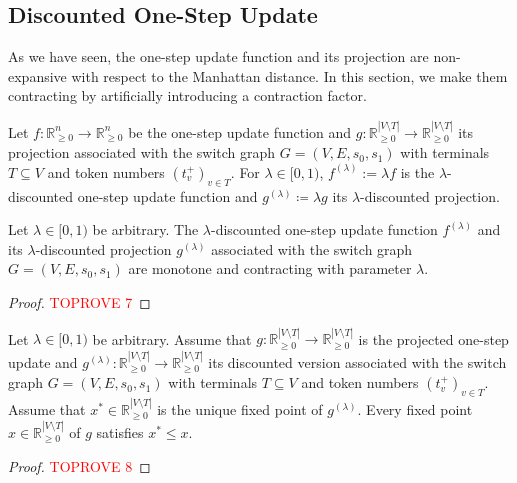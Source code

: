 \documentclass[a4paper,UKenglish,cleveref, autoref, thm-restate]{lipics-v2021}
\newcommand{\R}{\mathbb{R}}
\begin{document}
\subsection{Discounted One-Step Update}
\label{ssec:discounted_one-step_update}

As we have seen, the one-step update function and its projection are non-expansive with respect to the Manhattan distance. In this section, we make them contracting by artificially introducing a contraction factor. 

\begin{definition}
    Let $f : \R^n_{\geq 0} \rightarrow \R^n_{\geq 0}$ be the one-step update function and $g : \R^{|V \setminus T|}_{\geq 0} \rightarrow \R^{|V \setminus T|}_{\geq 0}$ its projection associated with the switch graph $G = (V, E, s_0, s_1)$ with terminals $T \subseteq V$ and token numbers $(t^+_v)_{v \in T}$. For $\lambda \in [0, 1)$, $f^{(\lambda)} := \lambda f$ is the $\lambda$-discounted one-step update function and $g^{(\lambda)} \coloneqq \lambda g$ its $\lambda$-discounted projection.
\end{definition}

\begin{corollary}
    Let $\lambda \in [0, 1)$ be arbitrary. The $\lambda$-discounted one-step update function $f^{(\lambda)}$ and its $\lambda$-discounted projection $g^{(\lambda)}$ associated with the switch graph $G = (V, E, s_0, s_1)$ are monotone and contracting with parameter $\lambda$.
\end{corollary}
\begin{proof}\textcolor{red}{TOPROVE 7}\end{proof}

\begin{lemma}
\label{lemma:unique_fixed_point_meaning}
    Let $\lambda \in [0, 1)$ be arbitrary. Assume that $g : \R^{|V \setminus T|}_{\geq 0} \rightarrow \R^{|V \setminus T|}_{\geq 0}$ is the projected one-step update and $g^{(\lambda)} : \R^{|V \setminus T|}_{\geq 0} \rightarrow \R^{|V \setminus T|}_{\geq 0}$ its discounted version associated with the switch graph $G = (V, E, s_0, s_1)$ with terminals $T \subseteq V$ and token numbers $(t^+_v)_{v \in T}$. Assume that $x^* \in \R^{|V \setminus T|}_{\geq 0}$ is the unique fixed point of $g^{(\lambda)}$. Every fixed point $x \in \R^{|V \setminus T|}_{\geq 0}$ of $g$ satisfies $x^* \leq x$. 
\end{lemma}
\begin{proof}\textcolor{red}{TOPROVE 8}\end{proof}
\end{document}
